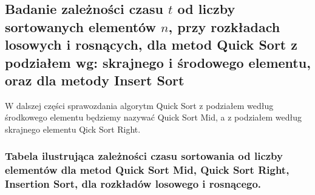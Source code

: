 \documentclass[polish,polish,a4paper]{article}
\begin{document}
\begin{spacing}{1.5}
\section{Badanie zależności czasu $t$ od liczby sortowanych elementów $n$, przy rozkładach losowych i rosnących, dla metod Quick Sort z podziałem wg: skrajnego i środowego elementu, oraz dla metody Insert Sort}

W dalszej części sprawozdania algorytm Quick Sort z podziałem według środkowego elementu będziemy nazywać Quick Sort Mid, a z podziałem według skrajnego elementu Qick Sort Right.


	\subsubsection*{Tabela ilustrująca zależności czasu sortowania od liczby elementów dla metod Quick Sort Mid, Quick Sort Right, Insertion Sort, dla rozkładów losowego i rosnącego.}



\end{spacing}
\end{document}
